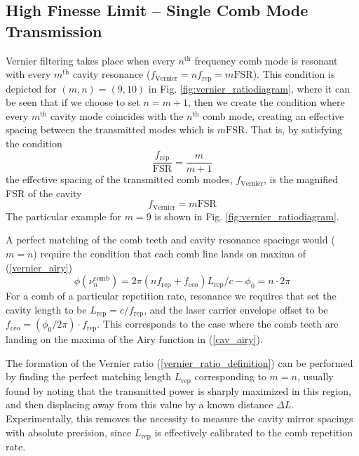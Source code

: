\documentclass[12pt]{report}
\begin{document}
	\subsection{High Finesse Limit -- Single Comb Mode Transmission}
	
	Vernier filtering \cite{vernier_gohle} takes place when every $n^\mathrm{th}$ frequency comb mode is resonant with every $m^\mathrm{th}$ cavity resonance ($f_\mathrm{Vernier} = nf_\mathrm{rep} = m \mathrm{FSR}$). This condition is depicted for $(m,n) = (9, 10)$ in Fig. \ref{fig:vernier_ratiodiagram}, where it can be seen that if we choose to set $n = m + 1$, then we create the condition where every $m^\mathrm{th}$ cavity mode coincides with the $n^\mathrm{th}$ comb mode, creating an effective spacing between the transmitted modes which is $m \mathrm{FSR}$. That is, by satisfying the condition
	\begin{equation} \label{vernier_ratio_definition}
		\frac{f_\mathrm{rep}}{\mathrm{FSR}} = \frac{m}{m+1}
	\end{equation}
	the effective spacing of the transmitted comb modes, $f_\mathrm{Vernier}$, is the magnified FSR of the cavity
	\begin{equation}
		f_\mathrm{Vernier} = m \mathrm{FSR}
	\end{equation}
	The particular example for $m=9$ is shown in Fig. \ref{fig:vernier_ratiodiagram}.
	
	
	
	A perfect matching of the comb teeth and cavity resonance spacings would ($m=n$) require the condition that each comb line lands on maxima of (\ref{vernier_airy})
	\begin{equation}
		\phi(\nu^\mathrm{comb}_n) = 2\pi (n f_\text{rep} + f_\text{ceo}) L_\text{rep}/c - \phi_0 =  n \cdot 2 \pi
	\end{equation}
	For a comb of a particular repetition rate, resonance we requires that set the cavity length to be $L_\text{rep} = c/f_\text{rep}$, and the laser carrier envelope offset to be $f_\text{ceo} = (\phi_0/2\pi)\cdot f_\text{rep}$. This corresponds to the case where the comb teeth are landing on the maxima of the Airy function in (\ref{cav_airy}).
	
	The formation of the Vernier ratio (\ref{vernier_ratio_definition}) can be performed by finding the perfect matching length $L_\mathrm{rep}$ corresponding to $m=n$, usually found by noting that the transmitted power is sharply maximized in this region, and then displacing away from this value by a known distance $\Delta L$. Experimentally, this removes the necessity to measure the cavity mirror spacings with absolute precision, since $L_\mathrm{rep}$ is effectively calibrated to the comb repetition rate.
	
\end{document}

